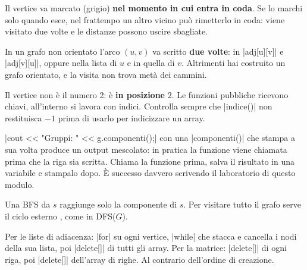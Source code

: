 \begin{trappola}
Il vertice va marcato (grigio) \textbf{nel momento in cui entra in coda}. Se lo marchi solo
quando esce, nel frattempo un altro vicino può rimetterlo in coda: viene visitato due
volte e le distanze possono uscire sbagliate.
\end{trappola}

\begin{trappola}
In un grafo non orientato l'arco $(u,v)$ va scritto \textbf{due volte}: in
\cc|adj[u][v]| e \cc|adj[v][u]|, oppure nella lista di $u$ e in quella di $v$. Altrimenti
hai costruito un grafo orientato, e la visita non trova metà dei cammini.
\end{trappola}

\begin{trappola}
Il vertice  non è il numero 2: è \textbf{in posizione} 2. Le funzioni pubbliche
ricevono chiavi, all'interno si lavora con indici. Controlla sempre che \cc|indice()| non
restituisca $-1$ prima di usarlo per indicizzare un array.
\end{trappola}

\begin{trappola}
\cc|cout << "Gruppi: " << g.componenti();| con una \cc|componenti()| che stampa a sua volta
produce un output mescolato: in pratica la funzione viene chiamata prima che la riga sia
scritta. Chiama la funzione prima, salva il risultato in una variabile e stampalo dopo.
È successo davvero scrivendo il laboratorio di questo modulo.
\end{trappola}

\begin{trappola}
Una BFS da $s$ raggiunge solo la componente di $s$. Per visitare tutto il grafo serve il
ciclo esterno , come in DFS($G$).
\end{trappola}

\begin{consiglio}
Per le liste di adiacenza: \cc|for| su ogni vertice, \cc|while| che stacca e cancella i
nodi della sua lista, poi \cc|delete[]| di tutti gli array. Per la matrice: \cc|delete[]|
di ogni riga, poi \cc|delete[]| dell'array di righe. Al contrario dell'ordine di creazione.
\end{consiglio}

